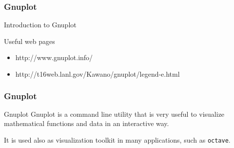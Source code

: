 \documentclass{beamer}
\author{Antonio Cervone}
\date{October 12 2012}
\institute{Politecnico di Milano}
\begin{document}

\begin{frame}

    \frametitle{Gnuplot}

    \begin{block}{Introduction to}
        \centering
        Gnuplot
    \end{block}

    \vspace{1cm}

    \begin{block}{Useful web pages}
        \centering
        \begin{itemize}
            \item http://www.gnuplot.info/
            \item http://t16web.lanl.gov/Kawano/gnuplot/legend-e.html
        \end{itemize}
    \end{block}

\end{frame}


\begin{frame}

    \frametitle{Gnuplot}

    \begin{block}{Gnuplot}
        \centering
        Gnuplot is a command line utility that is very useful to visualize
        mathematical functions and data in an interactive way.
    \end{block}

    \vspace{1cm}

    \begin{block}{}
        It is used also as visualization toolkit in many applications, such as
        \texttt{octave}.
    \end{block}

\end{frame}

\end{document}
